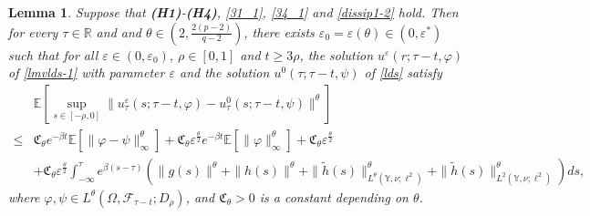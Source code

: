 \documentclass[11pt]{article}
\numberwithin{equation}{section}
\theoremstyle{plain}
\newtheorem{lemma}{Lemma}[section]
\begin{document}
\begin{lemma}\label{scr}
 Suppose that {\bf (H1)}-{\bf (H4)}, \eqref{31_1}, \eqref{34_1}  and \eqref{dissip1-2} hold.
 Then for every $\tau \in \mathbb{R}$ and and $\theta \in \left(2, \tfrac{2(p-2)}{q-2} \right)$,
 there exists $\varepsilon_0 = \varepsilon(\theta)  \in (0, \varepsilon^*)$ such that for all $\varepsilon \in (0, \varepsilon_0)$, $\rho \in [0,1]$ and $t \ge 3\rho$,
 the solution $u^{\varepsilon} (r; \tau-t, \varphi)$ of \eqref{lmvlds-1} with parameter $\varepsilon$ and the solution $u^0(\tau; \tau - t, \psi)$ of \eqref{lds} satisfy
 \begin{align}\label{jul12a1}
       & \mathbb{E} 
              \left[ \sup_{s \in [-\rho, 0] } 
                            \| u^{\varepsilon}_\tau(s; \tau - t, \varphi) 
                               - u^0_\tau(s; \tau - t, \psi) 
                            \|^\theta 
              \right]  \nonumber\\             
  \le & \mathfrak{C}_{\theta} e^{-\beta t}
                                          \mathbb{E}
                                                 \left[ \| \varphi - \psi \|_\infty^\theta
                                                 \right]  
            + \mathfrak{C}_{\theta} \varepsilon^{\frac{\theta}{2} }   
                      e^{-\beta t}
                             \mathbb{E} \left[ \|\varphi\|_{\infty}^{\theta} \right] 
            + \mathfrak{C}_\theta \varepsilon^{\frac{\theta}{2} } \nonumber\\
       & + \mathfrak{C}_\theta \varepsilon^{\frac{\theta}{2} } 
              \int_{-\infty}^{\tau} e^{\beta (s-\tau)}
                  \left( \|g(s)\|^{\theta} 
                           + \|h(s)\|^{\theta} 
                           + \| \widetilde{h}(s)\|_{L^{\theta}(\mathbb{Y},\nu; \ell^2)}^\theta
                           + \| \widetilde{h}(s)\|_{L^{2}(\mathbb{Y},\nu; \ell^2)}^\theta
                  \right) ds,                                                                    
 \end{align}  
 where $\varphi, \psi \in L^\theta(\Omega, \mathcal{F}_{\tau-t}; D_\rho)$, 
 and $\mathfrak{C}_{\theta} > 0$ is a constant depending on $\theta$.  
\end{lemma}
\end{document}

